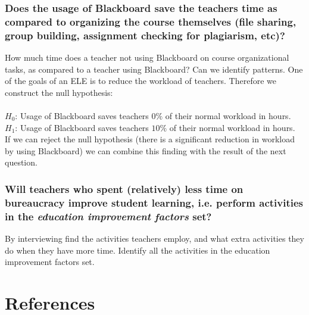 \subsection{Does the usage of Blackboard save the teachers time as compared to organizing the course themselves (file sharing, group building, assignment checking for plagiarism, etc)?}

How much time does a teacher not using Blackboard on course organizational tasks, as compared to a teacher using Blackboard? Can we identify patterns. One of the goals of an ELE is to reduce the workload of teachers. Therefore we construct the null hypothesis: \\ \\
$H_0$: Usage of Blackboard saves teachers $0\%$ of their normal workload in hours. \\
$H_1$: Usage of Blackboard saves teachers $10\%$ of their normal workload in hours. \\

If we can reject the null hypothesis (there is a significant reduction in workload by using Blackboard) we can combine this finding with the result of the next question. 

\subsection{Will teachers who spent (relatively) less time on bureaucracy improve student learning, i.e. perform activities in the \textit{education improvement factors} set?}


By interviewing find the activities teachers employ, and what extra activities they do when they have more time. Identify all the activities in the education improvement factors set. 




\chapter{References}

